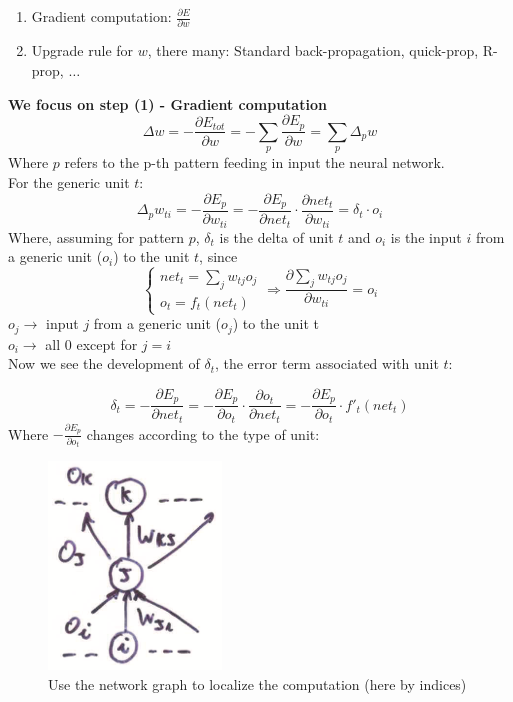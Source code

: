 \documentclass[../main.tex]{subfiles}
\begin{document}
\begin{enumerate}
    \item Gradient computation: $\frac{\partial E}{\partial w}$
    \item Upgrade rule for $w$, there many: Standard back-propagation, quick-prop, R-prop, $\dots$
\end{enumerate}
\noindent \textbf{We focus on step (1) - Gradient computation}\\
$$\Delta w = - \frac{\partial E_{tot}}{\partial w} = - \sum_{p} \frac{\partial E_p}{\partial w} = \sum_{p} \Delta_{p}w$$
Where $p$ refers to the p-th pattern feeding in input the neural network.\\

\noindent For the generic unit $t$:
$$\Delta_{p} w_{ti} = - \frac{\partial E_{p}}{\partial w_{ti}} = - \frac{\partial E_{p}}{\partial net_t} \cdot \frac{\partial net_t}{\partial w_{ti}} = \delta_{t} \cdot o_i$$
Where, assuming for pattern $p$, $\delta_t$ is the delta of unit $t$ and $o_i$ is the  input $i$ from a generic unit ($o_i$) to the unit $t$, since
\[
    \left\{
        \begin{array}{ll}
            net_t = \sum_{j} w_{tj}o_j\\
            o_t = f_t(net_t)
        \end{array}
    \right.
    \Rightarrow
    \frac{\partial \sum_{j} w_{tj}o_j}{\partial w_{ti}} = o_i
\]
$o_j\rightarrow$ input $j$ from a generic unit ($o_j$) to the unit t\\
$o_i\rightarrow$ all $0$ except for $j=i$\\

\noindent Now we see the development of $\delta_t$, the error term associated with unit $t$:

$$\delta_t = - \frac{\partial E_p}{\partial net_t} = - \frac{\partial E_p}{\partial o_t} \cdot \frac{\partial o_t}{\partial net_t} = - \frac{\partial E_p}{\partial o_t} \cdot f'_t(net_t)$$
Where $- \frac{\partial E_p}{\partial o_t}$ changes according to the type of unit:

\begin{figure}[H]
    \centering
    \includegraphics[scale = 0.4]{lectures/4_neural_networks/4_computation_graph_backProp.png}
    \caption{Use the network graph to localize the computation (here by indices)}
    \label{fig:4_computation_graph_backProp}
\end{figure}
\end{document}
